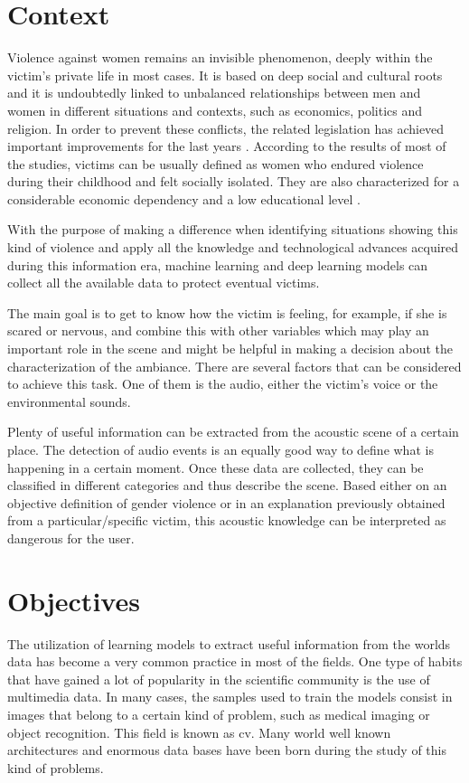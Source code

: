 \section{Context}
	Violence against women remains an invisible phenomenon, deeply within the victim’s private life in most cases. It is based on deep social and cultural roots and it is undoubtedly linked to unbalanced relationships between men and women in different situations and contexts, such as economics, politics and religion. In order to prevent these conflicts, the related legislation has achieved important improvements for the last years \cite{}. According to the results of most of the studies, victims can be usually defined as women who endured violence during their childhood and felt socially isolated. They are also characterized for a considerable economic dependency and a low educational level \cite{}.

	With the purpose of making a difference when identifying situations showing this kind of violence and apply all the knowledge and technological advances acquired during this information era, machine learning and deep learning models can collect all the available data to protect eventual victims.
	
	The main goal is to get to know how the victim is feeling, for example, if she is scared or nervous, and combine this with other variables which may play an important role in the scene and might be helpful in making a decision about the characterization of the ambiance. There are several factors that can be considered to achieve this task. One of them is the audio, either the victim's voice or the environmental sounds.
	
	Plenty of useful information can be extracted from the acoustic scene of a certain place. The detection of audio events is an equally good way to define what is happening in a certain moment. Once these data are collected, they can be classified in different categories and thus describe the scene. Based either on an objective definition of gender violence or in an explanation previously obtained from a particular/specific victim, this acoustic knowledge can be interpreted as dangerous for the user.

	
\section{Objectives}
	The utilization of learning models to extract useful information from the worlds data has become a very common practice in most of the fields. One type of habits that have gained a lot of popularity in the scientific community is the use of multimedia data. In many cases, the samples used to train the models consist in images that belong to a certain kind of problem, such as medical imaging or object recognition. This field is known as \acrfull{cv}. Many world well known architectures and enormous data bases have been born during the study of this kind of problems.
	
